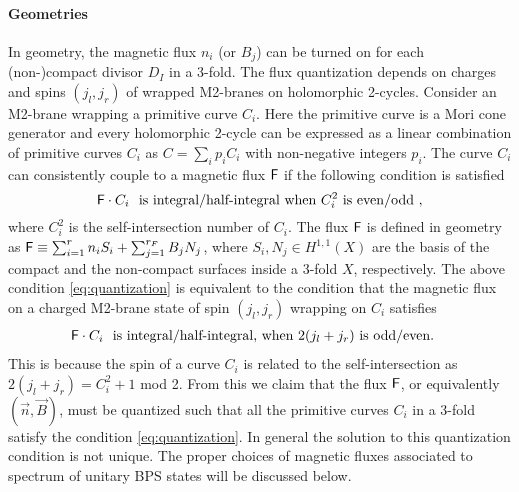 \paragraph{Geometries}
In geometry, the magnetic flux $n_i$ (or $B_j$) can be turned on for each (non-)compact divisor $D_I$ in a 3-fold.
The flux quantization depends on charges and spins $(j_l,j_r)$ of wrapped M2-branes on holomorphic 2-cycles. Consider an M2-brane wrapping a primitive curve $C_i$. Here the primitive curve is a Mori cone generator and every holomorphic 2-cycle can be expressed as a linear combination of primitive curves $C_i$ as $C=\sum_i p_i C_i$ with non-negative integers $p_i$. The curve $C_i$ can consistently couple to a magnetic flux ${\sf F}$ if the following condition is satisfied \cite{Huang:2017mis}
\begin{equation}\label{eq:quantization}
	{\sf F}\cdot C_i \ \text{ is integral/half-integral when } C_i^2 \ {\rm is \ even/odd } \ ,
\end{equation}
where $C_i^2$ is the self-intersection number of $C_i$. The flux ${\sf F}$ is defined in geometry as ${\sf F}\equiv\sum_{i=1}^r n_i S_i + \sum_{j=1}^{r_F} B_j N_j$,  where $S_i, N_j\in H^{1,1}(X)$ are the basis of the compact and the non-compact surfaces inside a 3-fold $X$, respectively. The above condition \eqref{eq:quantization} is equivalent to the condition that the magnetic flux on a charged M2-brane state of spin $(j_l,j_r)$ wrapping on $C_i$ satisfies  
\begin{align}
{\sf F}\cdot C_i ~~&\text{is integral/half-integral, when $2(j_l+j_r)$ is odd/even}. 	
\end{align}
This is because the spin of a curve $C_i$ is related to the self-intersection as $2(j_l+j_r) = C_i^2+1$ mod 2.  From this we claim that the flux ${\sf F}$, or equivalently $(\vec{n},\vec{B})$, must be quantized such that all the primitive curves $C_i$ in a 3-fold satisfy the condition \eqref{eq:quantization}. In general the solution to this quantization condition is not unique. The proper choices of magnetic fluxes associated to spectrum of unitary BPS states will be discussed below.

